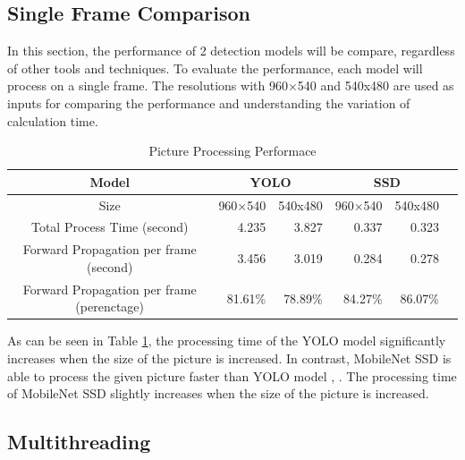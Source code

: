         \subsection{Single Frame Comparison}
            In this section, the performance of 2 detection models will be compare, regardless of other tools and techniques.
            To evaluate the performance, each model will process on a single frame.
            The resolutions with 960×540 and 540x480 are used as inputs for comparing the performance and understanding the variation of calculation time.

            \begin{table}[!htp]\centering
                \scriptsize
                \begin{tabular}{lrrrrrr}\toprule
                    \multicolumn{2}{c}{Model} &\multicolumn{2}{c}{YOLO} &\multicolumn{2}{c}{SSD} \\\midrule
                    \multicolumn{2}{c}{Size} &960×540 &540x480 &960×540 &540x480 \\
                    \multicolumn{2}{c}{Total Process Time (second)} &4.235 &3.827 &0.337 &0.323 \\
                    \multicolumn{2}{c}{Forward Propagation per frame (second)} &3.456 &3.019 &0.284 &0.278 \\
                    \multicolumn{2}{c}{Forward Propagation per frame (perenctage)} &81.61\% &78.89\% &84.27\% &86.07\% \\
                    \bottomrule
                \end{tabular}

                \caption{Picture Processing Performace}\label{performance:picture}
            \end{table}

            As can be seen in Table \ref{performance:picture}, the processing time of the YOLO model significantly increases when the size of the picture is increased.
            In contrast, MobileNet SSD is able to process the given picture faster than YOLO model \cite{tensorflow2015-whitepaper}, \cite{YOLO-v3}.
            The processing time of MobileNet SSD slightly increases when the size of the picture is increased.

        \subsection{Multithreading}

